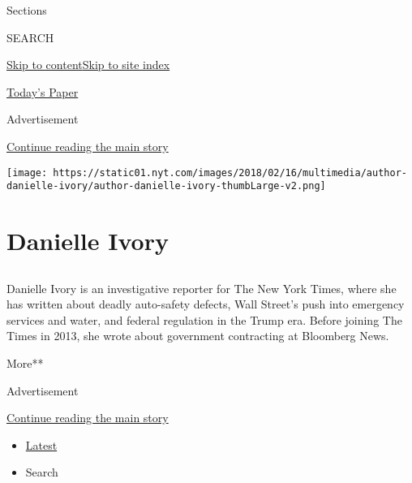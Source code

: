 Sections

SEARCH

\protect\hyperlink{site-content}{Skip to
content}\protect\hyperlink{site-index}{Skip to site index}

\href{https://myaccount.nytimes.com/auth/login?response_type=cookie\&client_id=vi}{}

\href{https://www.nytimes.com/section/todayspaper}{Today's Paper}

Advertisement

\protect\hyperlink{after-top}{Continue reading the main story}

\texttt{[image: https://static01.nyt.com/images/2018/02/16/multimedia/author-danielle-ivory/author-danielle-ivory-thumbLarge-v2.png]}

\hypertarget{danielle-ivory}{%
\section{Danielle Ivory}\label{danielle-ivory}}

\subsection{}

Danielle Ivory is an investigative reporter for The New York Times,
where she has written about deadly auto-safety defects, Wall Street's
push into emergency services and water, and federal regulation in the
Trump era. Before joining The Times in 2013, she wrote about government
contracting at Bloomberg News.

More**

Advertisement

\protect\hyperlink{after-mid1}{Continue reading the main story}

\begin{itemize}
\tightlist
\item
  \protect\hyperlink{stream-panel}{Latest}
\item
  Search
\end{itemize}

